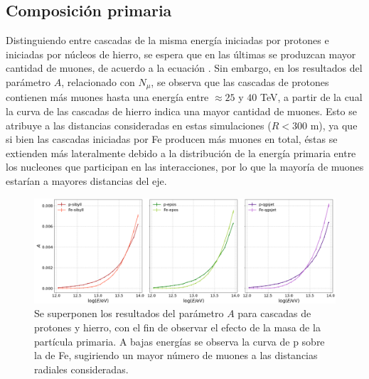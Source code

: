 \documentclass[12pt,letterpaper]{report}
\begin{document}
	\subsection{Composici\'on primaria}	
	Distinguiendo entre cascadas de la misma energ\'ia iniciadas por protones e iniciadas por n\'ucleos de hierro, se espera que en las \'ultimas se produzcan mayor cantidad de muones, de acuerdo a la ecuaci\'on . Sin embargo, en los resultados del par\'ametro $A$, relacionado con $N_{\mu}$, se observa que las cascadas de protones contienen m\'as muones hasta una energ\'ia entre $\approx 25$ y $40$ TeV, a partir de la cual la curva de las cascadas de hierro indica una mayor cantidad de muones. Esto se atribuye a las distancias consideradas en estas simulaciones ($R < 300$ m), ya que si bien las cascadas iniciadas por Fe producen m\'as muones en total, \'estas se extienden m\'as lateralmente debido a la distribuci\'on de la energ\'ia primaria entre los nucleones que participan en las interacciones, por lo que la mayor\'ia de muones estar\'ian a mayores distancias del eje. \\
		\begin{figure} []
		\includegraphics[width=\textwidth]{Figuras/composition_nkgA}
		\caption{Se superponen los resultados del par\'ametro $A$ para cascadas de protones y hierro, con el fin de observar el efecto de la masa de la part\'icula primaria. A bajas energ\'ias se observa la curva de p sobre la de Fe, sugiriendo un mayor n\'umero de muones a las distancias radiales consideradas.}
		\label{fig:composition_nkgA}
		\end{figure}		
	
\end{document}
